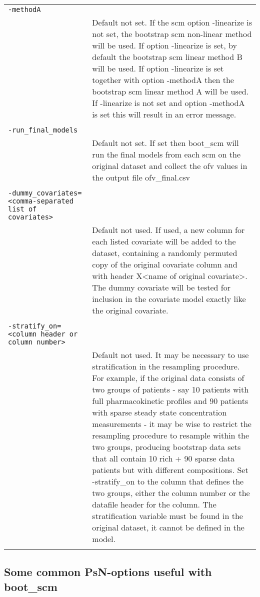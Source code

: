 \documentclass[a4paper,12pt]{article}
\begin{document}
\begin{longtable}{p{1in}p{4in}}
\verb|-methodA| & \\
\nopagebreak
 & Default not set. If the scm option -linearize is not set, the bootstrap scm non-linear method will be used. If option -linearize is set, by default the bootstrap scm linear method B will be used. If option -linearize is set  together with option -methodA then the bootstrap scm linear method A will be used. If -linearize is not set and option -methodA is set this will result in an error message.  \\
\\
\verb|-run_final_models| & \\
\nopagebreak
 & Default not set. If set then boot\_scm will run the final models from each scm on the original dataset and collect the ofv values in the output file ofv\_final.csv   \\
\\
\verb|-dummy_covariates= <comma-separated list of covariates>| & \\
\nopagebreak
 & Default not used. If used, a new column for each listed covariate will be added to the dataset, containing a randomly permuted copy of the original covariate column and with header X<name of original covariate>. The dummy covariate will be tested for inclusion in the covariate model exactly like the original covariate. \\
\\
\verb|-stratify_on=<column header or column number>| & \\
\nopagebreak
 & Default not used. It may be necessary to use stratification in the resampling procedure. For example, if the original data consists of two groups of patients - say 10 patients with full pharmacokinetic profiles and 90 patients with sparse steady state concentration measurements - it may be wise to restrict the resampling procedure to resample within the two groups, producing bootstrap data sets that all contain 10 rich + 90 sparse data patients but with different compositions. Set -stratify\_on to the column that defines the two groups, either the column number or the datafile header for the column. The stratification variable must be found in the original dataset, it cannot be defined in the model. \\
\\
\end{longtable}


\subsection{Some common PsN-options useful with boot\_scm}
\end{document}
